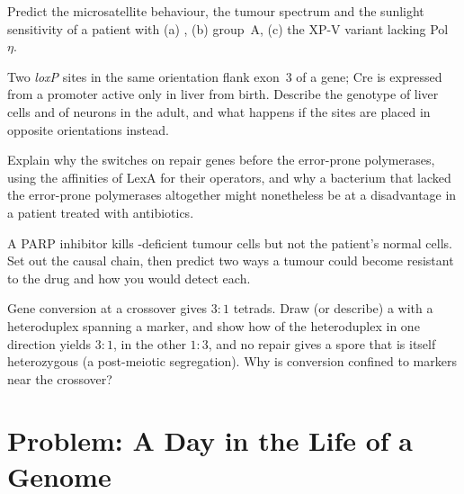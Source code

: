 \begin{exercise}[$\star\star$]\label{exo:b3:dna-repair:8}
Predict the microsatellite behaviour, the tumour spectrum and the
sunlight sensitivity of a patient with (a) , (b)
 group~A, (c) the XP-V variant lacking
Pol~$\eta$.
\end{exercise}

\begin{exercise}[$\star\star$]\label{exo:b3:dna-repair:9}
Two \emph{loxP} sites in the same orientation flank exon~3 of a gene;
Cre is expressed from a promoter active only in liver from birth.
Describe the genotype of liver cells and of neurons in the adult, and
what happens if the sites are placed in opposite orientations instead.
\end{exercise}

\begin{exercise}[$\star\star\star$]\label{exo:b3:dna-repair:10}
Explain why the  switches on repair genes before the
error-prone polymerases, using the affinities of LexA for their
operators, and why a bacterium that lacked the error-prone
polymerases altogether might nonetheless be at a disadvantage in a
patient treated with antibiotics.
\end{exercise}

\begin{exercise}[$\star\star\star$]\label{exo:b3:dna-repair:11}
A PARP inhibitor kills \emph{}-deficient tumour cells but not the
patient's normal cells. Set out the causal chain, then predict two
ways a tumour could become resistant to the drug and how you would
detect each.
\end{exercise}

\begin{exercise}[$\star\star\star$]\label{exo:b3:dna-repair:12}
Gene conversion at a crossover gives $3{:}1$ tetrads. Draw (or
describe) a  with a heteroduplex spanning a marker,
and show how  of the heteroduplex in one direction
yields $3{:}1$, in the other $1{:}3$, and no repair gives a spore that
is itself heterozygous (a post-meiotic segregation). Why is
conversion confined to markers near the crossover?
\end{exercise}

\section{Problem: A Day in the Life of a Genome}

